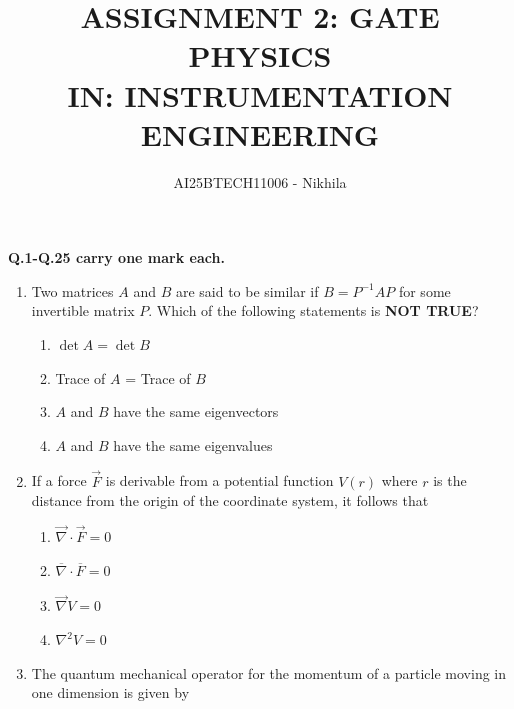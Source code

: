 \documentclass[journal,12pt,onecolumn]{IEEEtran}
\begin{document}
\title{
ASSIGNMENT 2: GATE PHYSICS \\
IN: INSTRUMENTATION ENGINEERING}
\author{AI25BTECH11006 - Nikhila }
\maketitle


\vspace{2em} 

\begin{center}
\textbf{Q.1-Q.25 carry one mark each.}   
\end{center}


\begin{enumerate}
\item Two matrices $A$ and $B$ are said to be similar if $B = P^{-1} A P$ for some invertible matrix $P$. Which of the following statements is \textbf{NOT TRUE}?

\hfill{}

\begin{multicols}{2}
\begin{enumerate}
    \item $\det A = \det B$
    \item Trace of $A$ = Trace of $B$
    \item $A$ and $B$ have the same eigenvectors
    \item $A$ and $B$ have the same eigenvalues
\end{enumerate}
\end{multicols}

\item If a force $\vec{F}$ is derivable from a potential function $V(r)$ where $r$ is the distance from the origin of the coordinate system, it follows that

\hfill{}

\begin{multicols}{4}
\begin{enumerate}
    \item $\vec{\nabla} \cdot \vec{F} = 0$
    \item $\overline{\nabla} \cdot \overline{F} = 0$
    \item $\vec{\nabla} V = 0$
    \item $\nabla^{2} V = 0$
\end{enumerate}
\end{multicols}

\item The quantum mechanical operator for the momentum of a particle moving in one dimension is given by


\end{enumerate}
\end{document}
